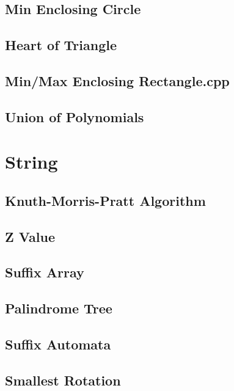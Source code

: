 \documentclass[a4paper,10pt,twocolumn,oneside]{article}
\begin{document}
\subsection{Min Enclosing Circle}

\subsection{Heart of Triangle}

\subsection{Min/Max Enclosing Rectangle.cpp}

\subsection{Union of Polynomials}


\section{String}
\subsection{Knuth-Morris-Pratt Algorithm}

\subsection{Z Value}

\subsection{Suffix Array}

\subsection{Palindrome Tree}

\subsection{Suffix Automata}

\subsection{Smallest Rotation}

\end{document}
